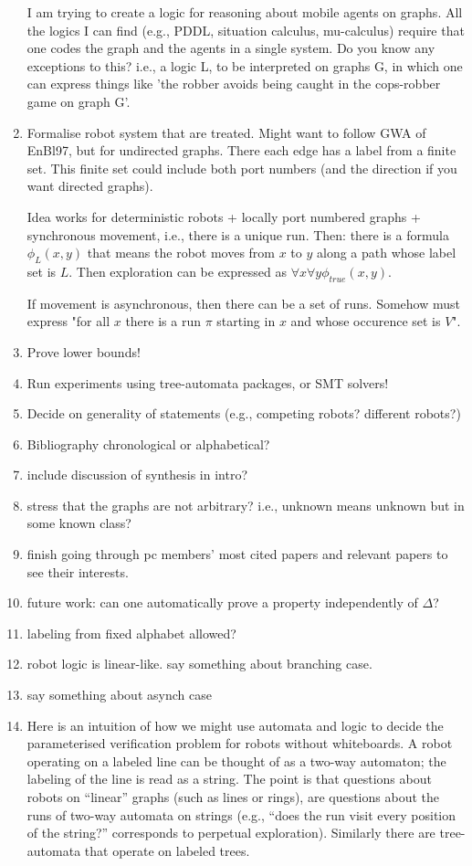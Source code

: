 \begin{enumerate}
I am trying to create a logic for reasoning about mobile agents on graphs. All
the logics I can find (e.g., PDDL, situation calculus, mu-calculus) require that
one codes the graph and the agents in a single system. Do you know any
exceptions to this? i.e., a logic L, to be interpreted on graphs G, in which one
can express things like 'the robber avoids being caught in the cops-robber game
on graph G'.

\item Formalise robot system that are treated. Might want to follow GWA of
EnBl97, but for undirected graphs. There each edge has a label from a finite
set. This finite set could include both port numbers (and the direction if you
want directed graphs).

Idea works for deterministic robots + locally port numbered graphs + synchronous
movement, i.e., there is a unique run.
Then: there is a formula $\phi_L(x,y)$ that means the robot moves from $x$ to
$y$ along a path whose label set is $L$. Then exploration can be expressed as
$\forall x \forall y \phi_{true}(x,y)$.

If movement is asynchronous, then there can be a set of runs. Somehow must
express "for all $x$ there is a run $\pi$ starting in $x$ and whose occurence
set is $V$".

\item Prove lower bounds!
\item Run experiments using tree-automata packages, or SMT solvers!
\item Decide on generality of statements (e.g., competing robots? different
robots?)
\item Bibliography chronological or alphabetical?
\item include discussion of synthesis in intro?
\item stress that the graphs are not arbitrary? i.e., unknown means unknown but
in some known class?
\item finish going through pc members' most cited papers and relevant papers to
see their interests.
\item future work: can one automatically prove a property independently of
$\Delta$?
\item labeling from fixed alphabet allowed?
\item robot logic is linear-like. say something about branching case.
\item say something about asynch case


\item Here is an intuition of how we might use automata and logic to decide the
parameterised verification problem for robots without whiteboards. A robot
operating on a labeled line can be thought of as a two-way automaton; the
labeling of the line is read as a string. The point is that questions about
robots on ``linear'' graphs (such as lines or rings), are questions about the
runs of two-way automata on strings (e.g., ``does the run visit every position
of the string?'' corresponds to perpetual exploration). Similarly there are
tree-automata that operate on labeled trees.


\end{enumerate}
